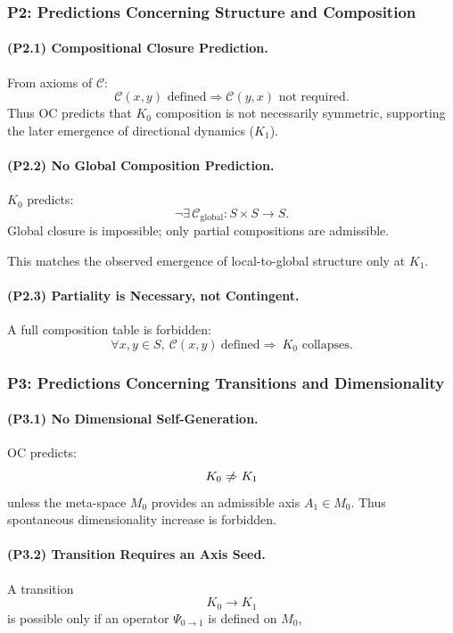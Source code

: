 \subsubsection{P2: Predictions Concerning Structure and Composition}

\paragraph{(P2.1) Compositional Closure Prediction.}
From axioms of $\mathcal{C}$:
\[
\mathcal{C}(x,y) \text{ defined} \Rightarrow \mathcal{C}(y,x) \text{ not required}.
\]
Thus OC predicts that $K_0$ composition is not necessarily symmetric,
supporting the later emergence of directional dynamics ($K_1$).

\paragraph{(P2.2) No Global Composition Prediction.}
$K_0$ predicts:
\[
\neg \exists\, \mathcal{C}_{\mathrm{global}} : S\times S\to S.
\]
Global closure is impossible; only partial compositions are admissible.

This matches the observed emergence of local-to-global structure only at $K_1$.

\paragraph{(P2.3) Partiality is Necessary, not Contingent.}
A full composition table is forbidden:
\[
\forall x,y\in S,\ \mathcal{C}(x,y)\ \text{defined}
\Rightarrow\ K_0 \text{ collapses}.
\]

\subsubsection{P3: Predictions Concerning Transitions and Dimensionality}

\paragraph{(P3.1) No Dimensional Self-Generation.}
OC predicts:
\[
K_0 \centernot\Rightarrow K_1
\]
unless the meta-space $M_0$ provides an admissible axis $A_1\in M_0$.
Thus spontaneous dimensionality increase is forbidden.

\paragraph{(P3.2) Transition Requires an Axis Seed.}
A transition
\[
K_0 \longrightarrow K_1
\]
is possible only if an operator $\Psi_{0\to1}$ is defined on $M_0$,

